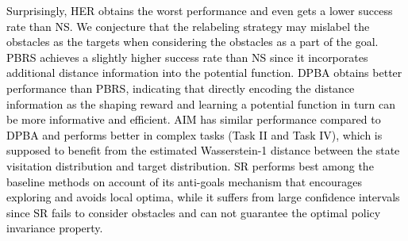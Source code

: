 \documentclass[journal]{IEEEtran}
\begin{document}
\textcolor{black}{Surprisingly, HER obtains the worst performance and even gets a lower success rate than NS. We conjecture that the relabeling strategy may mislabel the obstacles as the targets when considering the obstacles as a part of the goal.
PBRS achieves a slightly higher success rate than NS since it incorporates additional distance information into the potential function.
DPBA obtains better performance than PBRS, indicating that directly encoding the distance information as the shaping reward and learning a potential function in turn can be more informative and efficient.
AIM has similar performance compared to DPBA and performs better in complex tasks (Task II and Task IV), which is supposed to benefit from the estimated Wasserstein-1 distance between the state visitation distribution and target distribution.
SR performs best among the baseline methods on account of its anti-goals mechanism that encourages exploring and avoids local optima, while it suffers from large confidence intervals since SR fails to consider obstacles and can not guarantee the optimal policy invariance property.
}
\end{document}
